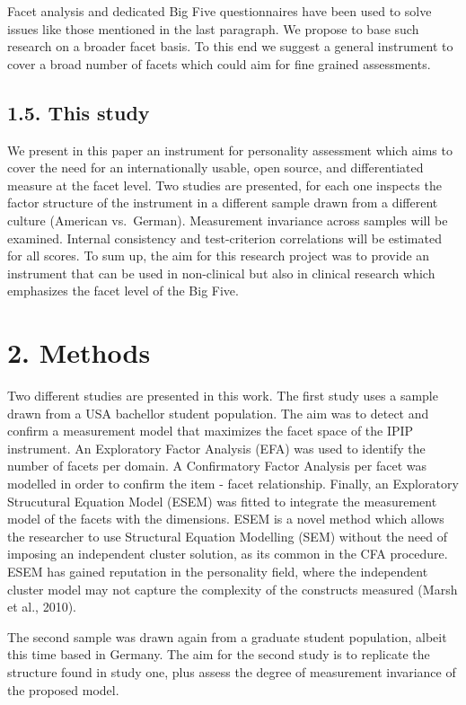 \documentclass[,man,floatsintext]{apa6}
\theoremstyle{definition}
\theoremstyle{definition}
\theoremstyle{definition}
\theoremstyle{remark}
\begin{document}
Facet analysis and dedicated Big Five questionnaires have been used to
solve issues like those mentioned in the last paragraph. We propose to
base such research on a broader facet basis. To this end we suggest a
general instrument to cover a broad number of facets which could aim for
fine grained assessments.

\hypertarget{this-study}{%
\subsection{1.5. This study}\label{this-study}}

We present in this paper an instrument for personality assessment which
aims to cover the need for an internationally usable, open source, and
differentiated measure at the facet level. Two studies are presented,
for each one inspects the factor structure of the instrument in a
different sample drawn from a different culture (American vs.~German).
Measurement invariance across samples will be examined. Internal
consistency and test-criterion correlations will be estimated for all
scores. To sum up, the aim for this research project was to provide an
instrument that can be used in non-clinical but also in clinical
research which emphasizes the facet level of the Big Five.

\hypertarget{methods}{%
\section{2. Methods}\label{methods}}

Two different studies are presented in this work. The first study uses a
sample drawn from a USA bachellor student population. The aim was to
detect and confirm a measurement model that maximizes the facet space of
the IPIP instrument. An Exploratory Factor Analysis (EFA) was used to
identify the number of facets per domain. A Confirmatory Factor Analysis
per facet was modelled in order to confirm the item - facet
relationship. Finally, an Exploratory Strucutural Equation Model (ESEM)
was fitted to integrate the measurement model of the facets with the
dimensions. ESEM is a novel method which allows the researcher to use
Structural Equation Modelling (SEM) without the need of imposing an
independent cluster solution, as its common in the CFA procedure. ESEM
has gained reputation in the personality field, where the independent
cluster model may not capture the complexity of the constructs measured
(Marsh et al., 2010).

The second sample was drawn again from a graduate student population,
albeit this time based in Germany. The aim for the second study is to
replicate the structure found in study one, plus assess the degree of
measurement invariance of the proposed model.
\end{document}
